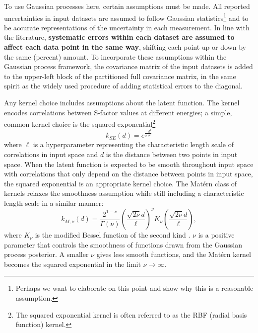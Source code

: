 \documentclass[%
 reprint,
superscriptaddress,
nofootinbib,
 amsmath,amssymb,
 aps,
 pra,
]{revtex4-2}
\begin{document}
To use Gaussian processes here, certain assumptions must be made. All reported uncertainties in input datasets are assumed to follow Gaussian statistics\footnote{Perhaps we want to elaborate on this point and show why this is a reasonable assumption.} and to be accurate representations of the uncertainty in each measurement. In line with the literature, \textbf{systematic errors within each dataset are assumed to affect each data point in the same way}, shifting each point up or down by the same (percent) amount. To incorporate these assumptions within the Gaussian process framework, the covariance matrix of the input datasets is added to the upper-left block of the partitioned full covariance matrix, in the same spirit as the widely used procedure of adding statistical errors to the diagonal. 

Any kernel choice includes assumptions about the latent function. The kernel encodes correlations between S-factor values at different energies; a simple, common kernel choice is the squared exponential\footnote{The squared exponential kernel is often referred to as the RBF (radial basis function) kernel.} \cite{Rasmussen2006}
\begin{equation}
	k_{SE}(d) = e^{\frac{-d^2}{2\ell^2}} \nonumber
\end{equation}
where $\ell$ is a hyperparameter representing the characteristic length scale of correlations in input space and $d$ is the distance between two points in input space. When the latent function is expected to be smooth throughout input space with correlations that only depend on the distance between points in input space, the squared exponential is an appropriate kernel choice. The Mat\'ern class of kernels relaxes the smoothness assumption while still including a characteristic length scale in a similar manner:
\begin{equation}
	k_{M,\nu}(d) =  \frac{2^{1-\nu}}{\Gamma(\nu)} \left( \frac{\sqrt{2\nu} d}{\ell} \right)^\nu K_\nu\left( \frac{\sqrt{2\nu} d}{\ell} \right), \nonumber
\end{equation}
where $K_\nu$ is the modified Bessel function of the second kind \cite{Rasmussen2006}. $\nu$ is a positive parameter that controls the smoothness of functions drawn from the Gaussian process posterior. A smaller $\nu$ gives less smooth functions, and the Mat\'ern kernel becomes the squared exponential in the limit $\nu\to\infty$. 
\end{document}
